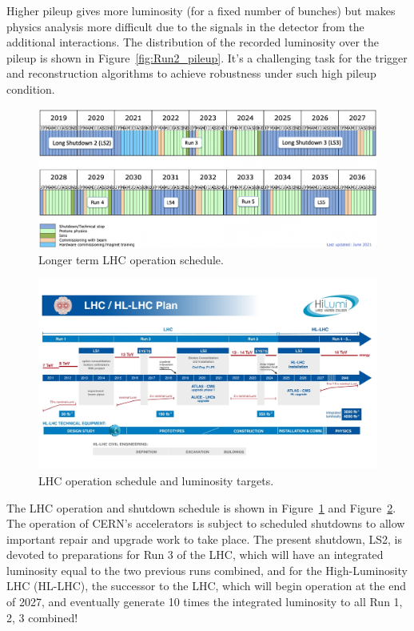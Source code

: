 	Higher pileup gives more luminosity (for a fixed number of bunches) 
	but makes physics analysis more difficult due to the signals in the detector 
	from the additional interactions. The distribution of the recorded luminosity over
	the pileup is shown in Figure~\ref{fig:Run2_pileup}. It's a challenging task for the 
	trigger and reconstruction algorithms to achieve robustness under such high pileup 
	condition.

	\begin{figure}[bht]
		\begin{centering}	
		\includegraphics[width=.8\textwidth]{Detector_plots/LHC-longterm-schedule.png}
		\caption{Longer term LHC operation schedule.%
			}
		\label{fig:LHC-longterm-schedule}
		\end{centering}
	\end{figure}
	
	\begin{figure}[bht]
		\begin{centering}
		\includegraphics[width=.65\textwidth]{Detector_plots/LHC-schedule-lumi.jpg}
		\caption{LHC operation schedule and luminosity targets.  %
			}
		\label{fig:LHC-schedule-lumi}
		\end{centering}
	\end{figure}
	The LHC operation and shutdown schedule is shown 
	in Figure~\ref{fig:LHC-longterm-schedule}
	and Figure~\ref{fig:LHC-schedule-lumi}.
	The operation of CERN’s accelerators is subject to scheduled shutdowns 
	to allow important repair and upgrade work to take place. 
	The present shutdown, LS2, is devoted to preparations for Run 3 of the LHC, 
	which will have an integrated luminosity equal to the two previous runs combined, 
	and for the High-Luminosity LHC (HL-LHC), 
	the successor to the LHC, which will begin operation at the end of 2027,
	and eventually generate 10 times the integrated luminosity to
	all Run 1, 2, 3 combined!
	
